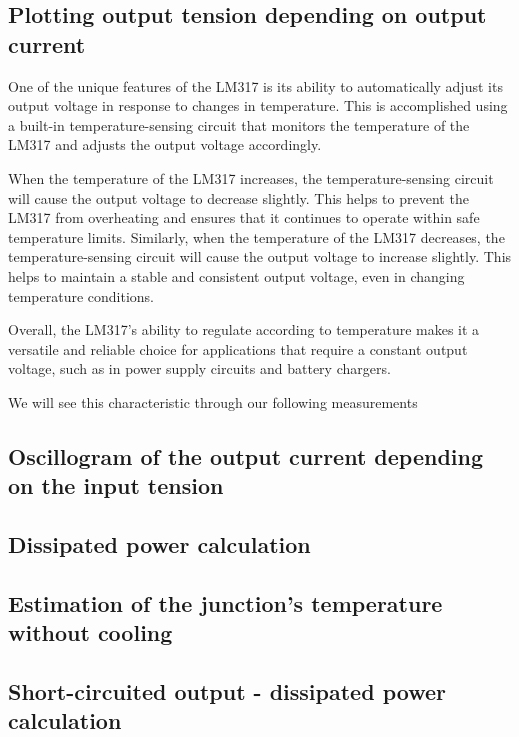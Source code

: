 \subsection{Plotting output tension depending on output current} \label{ssec:num12}
{
One of the unique features of the LM317 is its ability to automatically adjust its output voltage in response to changes in temperature. This is accomplished using a built-in temperature-sensing circuit that monitors the temperature of the LM317 and adjusts the output voltage accordingly.

When the temperature of the LM317 increases, the temperature-sensing circuit will cause the output voltage to decrease slightly. This helps to prevent the LM317 from overheating and ensures that it continues to operate within safe temperature limits. Similarly, when the temperature of the LM317 decreases, the temperature-sensing circuit will cause the output voltage to increase slightly. This helps to maintain a stable and consistent output voltage, even in changing temperature conditions.

Overall, the LM317's ability to regulate according to temperature makes it a versatile and reliable choice for applications that require a constant output voltage, such as in power supply circuits and battery chargers.

We will see this characteristic through our following measurements 
}
\subsection{Oscillogram of the output current depending on the input tension} \label{ssec:num13}
{}
\subsection{Dissipated power calculation} \label{ssec:num14}
{}
\subsection{Estimation of the junction's temperature without cooling} \label{ssec:num15}
{}
\subsection{Short-circuited output - dissipated power calculation} \label{ssec:num16}
{}
\clearpage